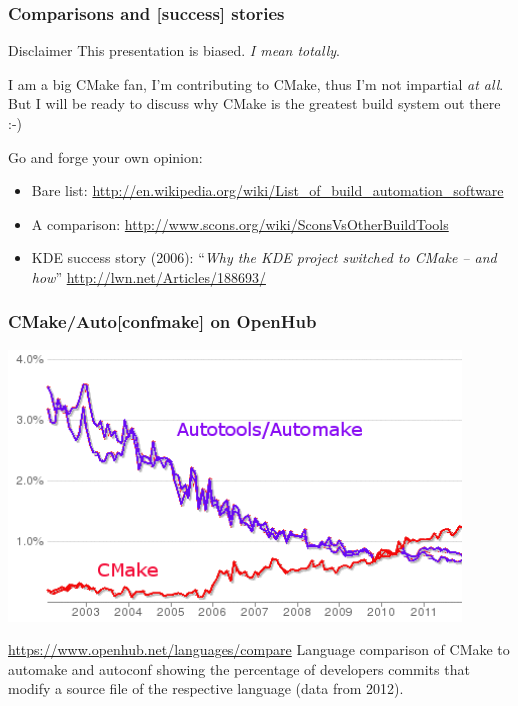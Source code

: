 \documentclass[compress,slidestop,table
              ]
               {beamer}
\begin{document}
\begin{frame}
\frametitle{Comparisons and [success] stories}

\begin{alertblock}{Disclaimer}
This presentation is biased. \emph{I mean totally}.

I am a big CMake fan, I'm contributing to CMake, thus I'm not
impartial \emph{at all}. But I will be ready to discuss why CMake
is the greatest build system out there :-)
\end{alertblock}

Go and forge your own opinion:
\begin{itemize}
\item Bare list: \url{http://en.wikipedia.org/wiki/List_of_build_automation_software}
\item A comparison: \url{http://www.scons.org/wiki/SconsVsOtherBuildTools}
\item KDE success story (2006): ``\textsl{Why the KDE project switched to CMake -- and how}''
     \url{http://lwn.net/Articles/188693/}
\end{itemize}
\end{frame}

\begin{frame}
\frametitle{CMake/Auto[conf\textbar make] on OpenHub}
\begin{center}
\includegraphics[width=0.9\textwidth,height=0.50\textheight]{compare_cmake_autotools_ohlo_color_transparent}
\end{center}
\begin{block}{\url{https://www.openhub.net/languages/compare}}
Language comparison of CMake to automake and
autoconf showing the percentage of developers commits that modify a
source file of the respective language (data from 2012).
\end{block}
\end{frame}
\end{document}
